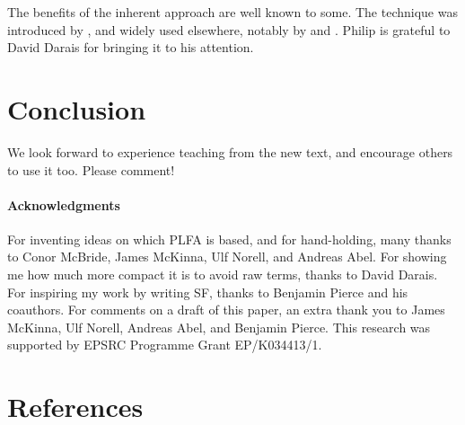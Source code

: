\documentclass[preprint,authoryear]{elsarticle}
\begin{document}
The benefits of the inherent approach 
are well known to some. The technique was introduced by
\citet{Altenkirch-and-Reus-1999}, and widely used elsewhere,
notably by \citet{Chapman-2009} and \citet{Allais-et-al-2017}.
Philip is grateful to David Darais for bringing it to his attention.


\section{Conclusion}

We look forward to experience teaching from the new text,
and encourage others to use it too.  Please comment!


\paragraph{Acknowledgments}

For inventing ideas on which PLFA is based, and for hand-holding, many thanks to
Conor McBride, James McKinna, Ulf Norell, and Andreas Abel.  For showing me how
much more compact it is to avoid raw terms, thanks to David Darais.  For
inspiring my work by writing SF, thanks to Benjamin Pierce and his coauthors.
For comments on a draft of this paper, an extra thank you to James McKinna, Ulf
Norell, Andreas Abel, and Benjamin Pierce. This research was supported by EPSRC
Programme Grant EP/K034413/1.


\section*{References}



\end{document}
